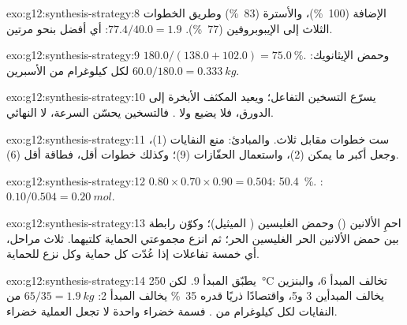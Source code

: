 \begin{solution}{exo:g12:synthesis-strategy:8}
الإضافة (\qty{100}{\percent})، والأسترة
(\qty{83}{\percent}) وطريق الخطوات الثلاث إلى الإيبوبروفين
(\qty{77}{\percent}). $77.4/40.0 = 1.9$: أي أفضل بنحو مرتين.
\end{solution}

\begin{solution}{exo:g12:synthesis-strategy:9}
$180.0/(138.0 + 102.0) = \qty{75.0}{\percent}$. وحمض الإيثانويك:
$60.0/180.0 = \qty{0.333}{kg}$ لكل كيلوغرام من الأسبرين.
\end{solution}

\begin{solution}{exo:g12:synthesis-strategy:10}
يسرّع التسخين التفاعل؛ ويعيد المكثف الأبخرة
إلى الدورق، فلا يضيع  ولا . فالتسخين يحسّن
السرعة، لا  النهائي.
\end{solution}

\begin{solution}{exo:g12:synthesis-strategy:11}
ست خطوات مقابل ثلاث. والمبادئ: منع النفايات (1)، وجعل  أكبر ما يمكن
(2)، واستعمال الحفّازات (9)؛ وكذلك خطوات أقل، فطاقة أقل (6).
\end{solution}

\begin{solution}{exo:g12:synthesis-strategy:12}
$0.80 \times 0.70 \times 0.90 = 0.504$: \qty{50.4}{\percent}. : $0.10/0.504 = \qty{0.20}{mol}$.
\end{solution}

\begin{solution}{exo:g12:synthesis-strategy:13}
احمِ  الألانين () وحمض الغليسين ( الميثيل)؛
وكوّن رابطة  بين حمض الألانين الحر  الغليسين
الحر؛ ثم انزع مجموعتي الحماية كلتيهما. ثلاث مراحل، أي خمسة
تفاعلات إذا عُدّت كل حماية وكل نزع للحماية.
\end{solution}

\begin{solution}{exo:g12:synthesis-strategy:14}
يطبّق  المبدأ 9. لكن \qty{250}{\celsius} تخالف
المبدأ 6، والبنزين يخالف المبدأين 3 و5، واقتصادًا ذريًا قدره
\qty{35}{\percent} يخالف المبدأ 2: $65/35 = \qty{1.9}{kg}$ من النفايات
لكل كيلوغرام من . فسمة خضراء واحدة لا تجعل العملية
خضراء.
\end{solution}

